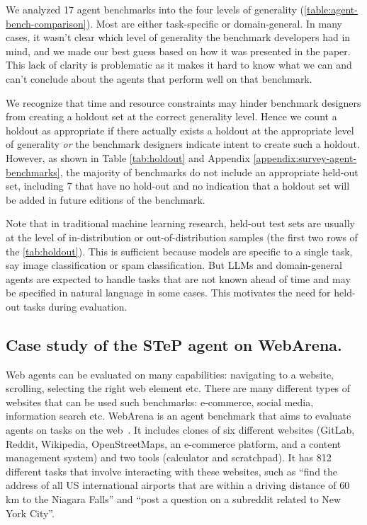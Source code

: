 \documentclass{article}
\begin{document}
We analyzed 17 agent benchmarks into the four levels of generality (\cref{table:agent-bench-comparison}). Most are either task-specific or domain-general. In many cases, it wasn't clear which level of generality the benchmark developers had in mind, and we made our best guess based on how it was presented in the paper. This lack of clarity is problematic as it makes it hard to know what we can and can't conclude about the agents that perform well on that benchmark.

We recognize that time and resource constraints may
hinder benchmark designers from creating a holdout set at the correct generality level. Hence we count a holdout as appropriate if there actually exists a holdout at the appropriate level of generality \textit{or} the benchmark designers indicate intent to create such a holdout. However, as shown in Table \ref{tab:holdout} and Appendix \ref{appendix:survey-agent-benchmarks}, the majority of benchmarks do not include an appropriate held-out set, including 7 that have no hold-out and no indication that a holdout set will be added in future editions of the benchmark. 

Note that in traditional machine learning research, held-out test sets are usually at the level of in-distribution or out-of-distribution samples (the first two rows of the \cref{tab:holdout}). This is sufficient because models are specific to a single task, say image classification or spam classification. But LLMs and domain-general agents are expected to handle tasks that are not known ahead of time and may be specified in natural language in some cases. This motivates the need for held-out tasks during evaluation.

 






    










\subsection{Case study of the STeP agent on WebArena.} 

Web agents can be evaluated on many capabilities: navigating to a website, scrolling, selecting the right web element etc. There are many different types of websites that can be used such benchmarks: e-commerce, social media, information search etc. 
WebArena is an agent benchmark that aims to evaluate agents on tasks on the web~\citep{zhou_webarena_2024}. It includes clones of six different websites (GitLab, Reddit, Wikipedia, OpenStreetMaps, an e-commerce platform, and a content management system) and two tools (calculator and scratchpad). 
It has 812 different tasks that involve interacting with these websites, such as ``find the address of all US international airports that are within a driving distance of 60 km to the Niagara Falls'' and ``post a question on a subreddit related to New York City''.
\end{document}
